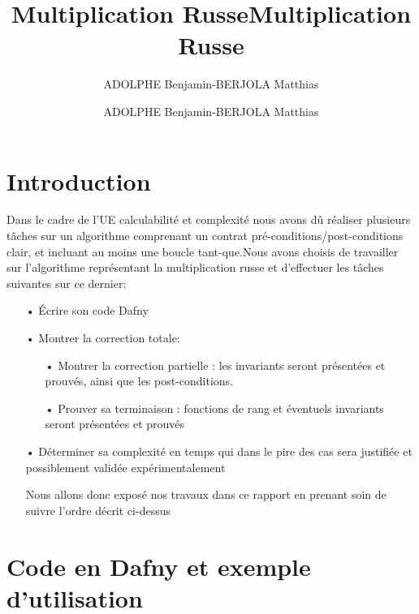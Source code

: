 \documentclass[12pt,a4paper]{report}
\author{ADOLPHE Benjamin-BERJOLA Matthias}
\title{Multiplication Russe}
\begin{document}
\title{Multiplication Russe}
\author{ADOLPHE Benjamin-BERJOLA Matthias}


\maketitle 

\newpage
\chapter{Introduction}
\begin{large}
\begin{flushleft}
Dans le cadre de l'UE calculabilité et complexité nous avons dû réaliser plusieurs tâches sur un algorithme comprenant un contrat pré-conditions/post-conditions clair, et incluant au moins une boucle tant-que.Nous avons choisis de travailler sur l'algorithme représentant la multiplication russe et d'effectuer les tâches suivantes sur ce dernier: 

\begin{itemize}
\item[•] Écrire son code Dafny
\medskip

\item[•] Montrer la correction totale:
\begin{itemize}
\item[•] Montrer la  correction partielle : les invariants seront présentées et prouvés, ainsi que les post-conditions.
\medskip

\item[•] Prouver sa terminaison : fonctions de rang et éventuels invariants seront présentées et prouvés
\medskip 
\end{itemize}

\item[•] Déterminer sa complexité en temps qui dans le pire des cas sera justifiée et possiblement validée expérimentalement

\medskip

Nous allons donc exposé nos travaux dans ce rapport en prenant soin de suivre l'ordre décrit ci-dessus
\end{itemize}
\end{flushleft}
\end{large}

\chapter{Code en Dafny et exemple d'utilisation}
\end{document}
